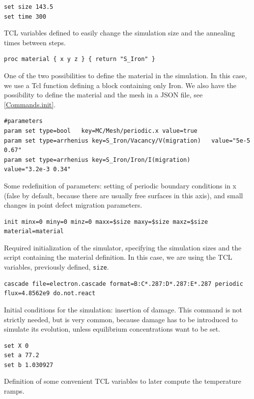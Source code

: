 \begin{lstlisting}[firstnumber=2]
set size 143.5
set time 300
\end{lstlisting}
TCL variables defined to easily change the simulation size and the annealing times between steps.

\begin{lstlisting}[firstnumber=5]
proc material { x y z } { return "S_Iron" }
\end{lstlisting}
One of the two possibilities to define the material in the simulation. In this case, we use a Tcl function defining a block containing only Iron. We also have the possibility to define the material and the mesh in a JSON file, see \ref{Commands.init}.

\begin{lstlisting}[firstnumber=7]
#parameters
param set type=bool   key=MC/Mesh/periodic.x value=true
param set type=arrhenius key=S_Iron/Vacancy/V(migration)   value="5e-5 0.67"
param set type=arrhenius key=S_Iron/Iron/I(migration)      value="3.2e-3 0.34"
\end{lstlisting}
Some redefinition of parameters: setting of periodic boundary conditions in x (false by default, because there are usually free surfaces in this axis), and small changes in point defect migration parameters.

\begin{lstlisting}[firstnumber=13]
init minx=0 miny=0 minz=0 maxx=$size maxy=$size maxz=$size material=material
\end{lstlisting}
Required initialization of the simulator, specifying the simulation sizes and the script containing the material definition. In this case, we are using the TCL variables, previously defined, {\tt size}.

\begin{lstlisting}[firstnumber=15]
cascade file=electron.cascade format=B:C*.287:D*.287:E*.287 periodic flux=4.8562e9 do.not.react
\end{lstlisting}
Initial conditions for the simulation: insertion of damage. This command is not strictly needed, but is very common, because damage has to be introduced to simulate its evolution, unless equilibrium concentrations want to be set.

\begin{lstlisting}[firstnumber=17]
set X 0
set a 77.2
set b 1.030927
\end{lstlisting}
Definition of some convenient TCL variables to later compute the temperature ramps.

